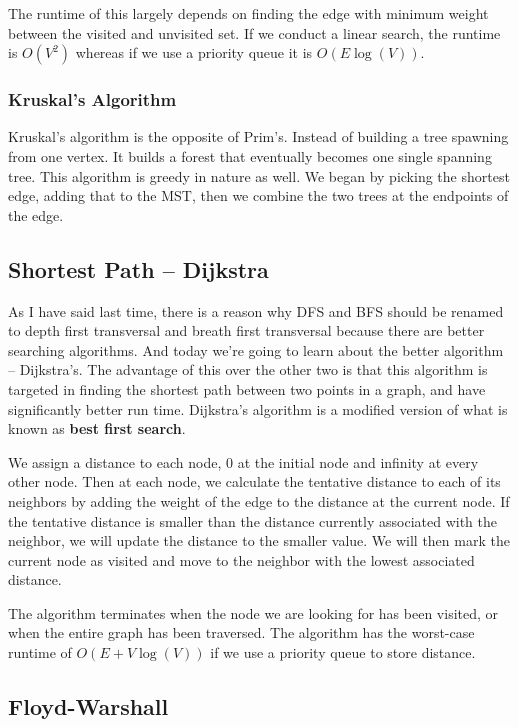 \documentclass[12 pt, twoside] {article}
\begin{document}
{The runtime of this largely depends on finding the edge with minimum weight
between the visited and unvisited set. If we conduct a linear search, the
runtime is $O(V^2)$ whereas if we use a priority queue it is $O(E \log(V))$.

\subsubsection*{Kruskal's Algorithm}

Kruskal's algorithm is the opposite of Prim's. Instead of building a tree
spawning from one vertex. It builds a forest that eventually becomes one single
spanning tree. This algorithm is greedy in nature as well. We began by picking
the shortest edge, adding that to the MST, then we combine the two trees at the
endpoints of the edge.

\subsection*{Shortest Path -- Dijkstra}

As I have said last time, there is a reason why DFS and BFS should be renamed to
depth first transversal and breath first transversal because there are better
searching algorithms. And today we're going to learn about the better algorithm
-- Dijkstra's. The advantage of this over the other two is that this algorithm
is targeted in finding the shortest path between two points in a graph, and have
significantly better run time. Dijkstra's algorithm is a modified version of
what is known as \textbf{best first search}.

We assign a distance to each node, 0 at the initial node and infinity at every
other node. Then at each node, we calculate the tentative distance to each of
its neighbors by adding the weight of the edge to the distance at the current
node. If the tentative distance is smaller than the distance currently
associated with the neighbor, we will update the distance to the smaller value.
We will then mark the current node as visited and move to the neighbor with the
lowest associated distance.

The algorithm terminates when the node we are looking for has been visited, or
when the entire graph has been traversed. The algorithm has the worst-case
runtime of $O(E + V \log(V))$ if we use a priority queue to store distance.

\subsection*{Floyd-Warshall}

}
\end{document}
